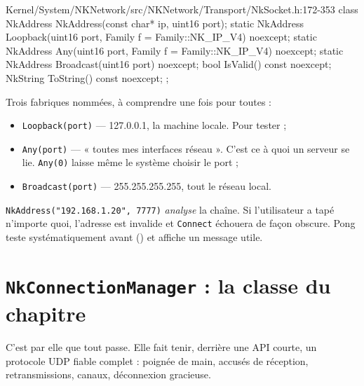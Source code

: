 \begin{nkcode}{Kernel/System/NKNetwork/src/NKNetwork/Transport/NkSocket.h:172-353}
class NkAddress {
        NkAddress(const char* ip, uint16 port);
        static NkAddress Loopback(uint16 port, Family f = Family::NK_IP_V4) noexcept;
        static NkAddress Any(uint16 port, Family f = Family::NK_IP_V4) noexcept;
        static NkAddress Broadcast(uint16 port) noexcept;
        bool IsValid() const noexcept;
        NkString ToString() const noexcept;
};
\end{nkcode}

Trois fabriques nommées, à comprendre une fois pour toutes :

\begin{itemize}
  \item \texttt{Loopback(port)} — 127.0.0.1, la machine locale. Pour tester ;
  \item \texttt{Any(port)} — « toutes mes interfaces réseau ». C'est ce à quoi un
        serveur se lie. \texttt{Any(0)} laisse même le système choisir le port ;
  \item \texttt{Broadcast(port)} — 255.255.255.255, tout le réseau local.
\end{itemize}

\begin{nkpiege}
\texttt{NkAddress("192.168.1.20", 7777)} \emph{analyse} la chaîne. Si
l'utilisateur a tapé n'importe quoi, l'adresse est invalide et
\texttt{Connect} échouera de façon obscure. Pong teste systématiquement avant
() et affiche
un message utile.
\end{nkpiege}

\section{\texttt{NkConnectionManager} : la classe du chapitre}

C'est par elle que tout passe. Elle fait tenir, derrière une API courte, un
protocole UDP fiable complet : poignée de main, accusés de réception,
retransmissions, canaux, déconnexion gracieuse.

